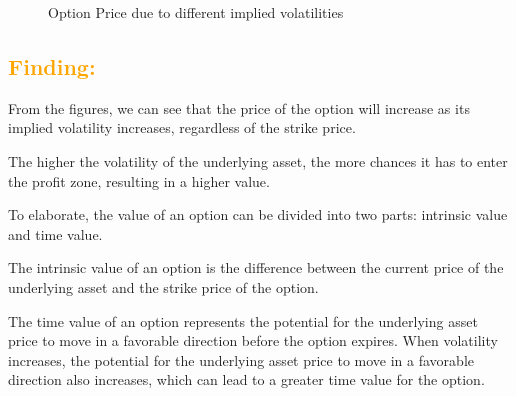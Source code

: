 \documentclass[11pt,en]{elegantpaper}
\begin{document}
\begin{figure}[htbp]
    \centering
    \quad
    \caption{Option Price due to different implied volatilities}
\end{figure}

\subsection*{\textcolor{orange}{Finding:}}
From the figures, we can see that the price of the option will increase as its implied volatility increases, regardless of the strike price. 

The higher the volatility of the underlying asset, the more chances it has to enter the profit zone, resulting in a higher value. 

To elaborate, the value of an option can be divided into two parts: intrinsic value and time value. 

The intrinsic value of an option is the difference between the current price of the underlying asset and the strike price of the option. 

The time value of an option represents the potential for the underlying asset price to move in a favorable direction before the option expires. When volatility increases, the potential for the underlying asset price to move in a favorable direction also increases, which can lead to a greater time value for the option.
\end{document}
